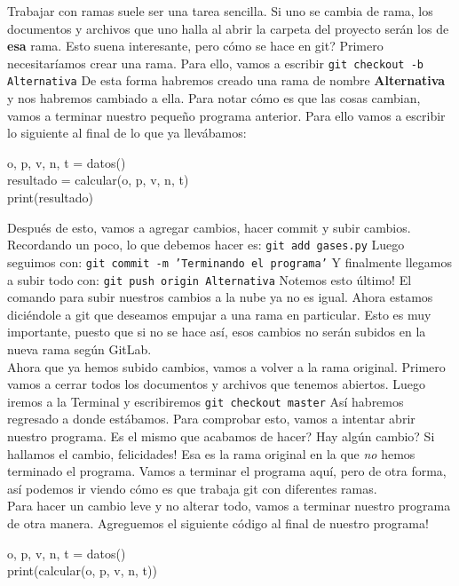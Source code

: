 \documentclass[10pt,letterpaper]{article}
\newcommand{\inlinecode}[1]{
\colorbox{light-gray}{\texttt{#1}}
}
\newenvironment{Code}
{
\begin{lrbox}{\selvestebox}%
\begin{minipage}{\dimexpr\columnwidth-2\fboxsep\relax}
\fontfamily{\ttdefault}\selectfont
}
{\end{minipage}\end{lrbox}%
\begin{center}
\colorbox{light-gray}{\usebox{\selvestebox}}
\end{center}
}
\begin{document}
Trabajar con ramas suele ser una tarea sencilla. Si uno se cambia de rama, los documentos y archivos que uno halla al abrir la carpeta del proyecto ser\'an los de \textbf{esa} rama. Esto suena interesante, pero c\'omo se hace en git? Primero necesitar\'iamos crear una rama. Para ello, vamos a escribir \inlinecode{git checkout -b Alternativa} De esta forma habremos creado una rama de nombre \textbf{Alternativa} y nos habremos cambiado a ella. Para notar c\'omo es que las cosas cambian, vamos a terminar nuestro peque\~no programa anterior. Para ello vamos a escribir lo siguiente al final de lo que ya llev\'abamos:

\begin{Code}
o, p, v, n, t = datos()\\
resultado = calcular(o, p, v, n, t)\\
print(resultado)
\end{Code}

Despu\'es de esto, vamos a agregar cambios, hacer commit y subir cambios. Recordando un poco, lo que debemos hacer es: \inlinecode{git add gases.py} Luego seguimos con: \inlinecode{git commit -m 'Terminando el programa'} Y finalmente llegamos a subir todo con: \inlinecode{git push origin Alternativa} Notemos esto \'ultimo! El comando para subir nuestros cambios a la nube ya no es igual. Ahora estamos dici\'endole a git que deseamos empujar a una rama en particular. Esto es muy importante, puesto que si no se hace as\'i, esos cambios no ser\'an subidos en la nueva rama seg\'un GitLab.\\

Ahora que ya hemos subido cambios, vamos a volver a la rama original. Primero vamos a cerrar todos los documentos y archivos que tenemos abiertos. Luego iremos a la Terminal y escribiremos \inlinecode{git checkout master} As\'i habremos regresado a donde est\'abamos. Para comprobar esto, vamos a intentar abrir nuestro programa. Es el mismo que acabamos de hacer? Hay alg\'un cambio? Si hallamos el cambio, felicidades! Esa es la rama original en la que \textit{no} hemos terminado el programa. Vamos a terminar el programa aqu\'i, pero de otra forma, as\'i podemos ir viendo c\'omo es que trabaja git con diferentes ramas.\\

Para hacer un cambio leve y no alterar todo, vamos a terminar nuestro programa de otra manera. Agreguemos el siguiente c\'odigo al final de nuestro programa!

\begin{Code}
o, p, v, n, t = datos()\\
print(calcular(o, p, v, n, t))
\end{Code}
\end{document}
